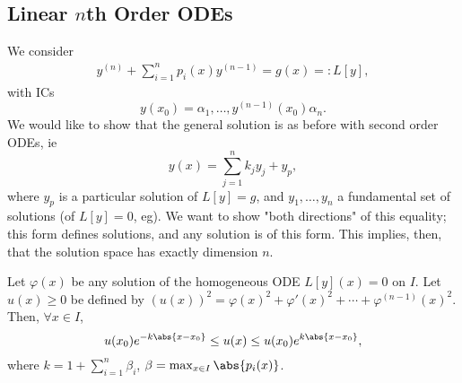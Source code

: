 \subsection{Linear \texorpdfstring{$n$}{n}th Order ODEs}

We consider \begin{align*}
    y^{(n)} + \sum_{i=1}^n p_i(x)y^{(n-1)} = g(x) =: L[y],
\end{align*}
with ICs\[
y(x_0) = \alpha_1, \dots, y^{(n-1)}(x_0)\alpha_n.    
\]
We would like to show that the general solution is as before with second order ODEs, ie \[
y(x) = \sum_{j=1}^n k_j y_j + y_p,    
\]
where $y_p$ is a particular solution of $L[y] = g$, and $y_1, \dots, y_n$ a fundamental set of solutions (of $L[y] = 0$, eg). We want to show "both directions" of this equality; this form defines solutions, and any solution is of this form. This implies, then, that the solution space has exactly dimension $n$.

\begin{lemma}
    Let $\varphi(x)$ be any solution of the homogeneous ODE $L[y](x) = 0$ on $I$. Let $u(x) \geq 0$ be defined by $(u(x))^2 = \varphi(x)^2 + \varphi'(x)^2 + \cdots + \varphi^{(n-1)}(x)^2$. Then, $\forall x\in I$, \[
    u(x_0)e^{-k\abs{x - x_0}} \leq u(x) \leq u(x_0)e^{k\abs{x-x_0}},
    \]
    where $k = 1 + \sum_{i=1}^n \beta_i$, $\beta = \max_{x \in I}\abs{p_i(x)}$.
\end{lemma}
